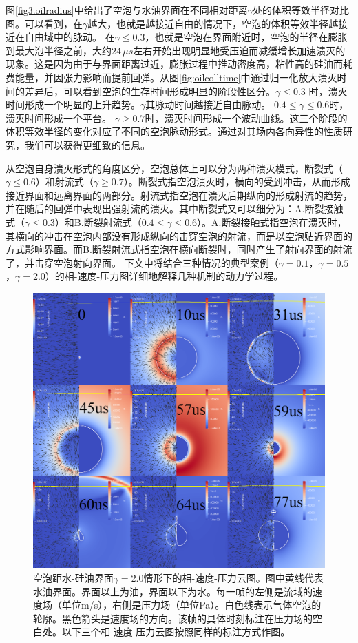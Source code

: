 图\ref{fig3.oilradius}中给出了空泡与水油界面在不同相对距离$\gamma$处的体积等效半径对比图。可以看到，在$\gamma$越大，也就是越接近自由的情况下，空泡的体积等效半径越接近在自由域中的脉动。
在$\gamma\leq 0.3$，也就是空泡在界面附近时，空泡的半径在膨胀到最大泡半径之前，大约$24\,\mu s$左右开始出现明显地受压迫而减缓增长加速溃灭的现象。这是因为由于与界面距离过近，膨胀过程中推动密度高，粘性高的硅油而耗费能量，并因张力影响而提前回弹。从图\ref{fig:oilcolltime}中通过归一化放大溃灭时间的差异后，可以看到空泡的生存时间形成明显的阶段性区分。$\gamma\leq 0.3$ 时，溃灭时间形成一个明显的上升趋势。$\gamma$其脉动时间越接近自由脉动。
$0.4\leq\gamma\leq 0.6$时，溃灭时间形成一个平台。
$\gamma\geq 0.7$时，溃灭时间形成一个波动曲线。这三个阶段的体积等效半径的变化对应了不同的空泡脉动形式。通过对其场内各向异性的性质研究，我们可以获得更细致的信息。



从空泡自身溃灭形式的角度区分，空泡总体上可以分为两种溃灭模式，断裂式（$\gamma\leq 0.6$）和射流式（$\gamma\geq 0.7$）。断裂式指空泡溃灭时，横向的受到冲击，从而形成接近界面和远离界面的两部分。射流式指空泡在溃灭后期纵向的形成射流的趋势，并在随后的回弹中表现出强射流的溃灭。其中断裂式又可以细分为：A.断裂接触式（$\gamma\leq 0.3$）和B.断裂射流式（$0.4\leq\gamma\leq 0.6$）。A.断裂接触式指空泡在溃灭时，其横向的冲击在空泡内部没有形成纵向的击穿空泡的射流，而是以空泡贴近界面的方式影响界面。而B.断裂射流式指空泡在横向断裂时，同时产生了射向界面的射流了，并击穿空泡射向界面。
下文中将结合三种情况的典型案例（$\gamma= 0.1$，$\gamma= 0.5$，$\gamma= 2.0$）的相-速度-压力图详细地解释几种机制的动力学过程。


\begin{figure}[h]
    \centering
    \includegraphics[width=0.9\linewidth]{img/fig3.oil.2.0.png}
    \caption[空泡距水-硅油界面$\gamma = 2.0$情形下的相-速度-压力云图]{空泡距水-硅油界面$\gamma = 2.0$情形下的相-速度-压力云图。图中黄线代表水油界面。界面以上为油，界面以下为水。每一帧的左侧是流域的速度场（单位m/s），右侧是压力场（单位Pa）。白色线表示气体空泡的轮廓。黑色箭头是速度场的方向。该帧的具体时刻标注在压力场的空白处。以下三个相-速度-压力云图按照同样的标注方式作图。}
    \label{fig3.oil2.0}
\end{figure}


